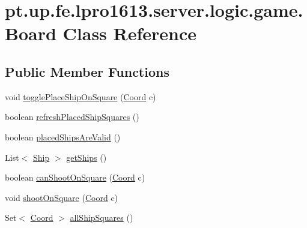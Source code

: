 \hypertarget{classpt_1_1up_1_1fe_1_1lpro1613_1_1server_1_1logic_1_1game_1_1_board}{}\section{pt.\+up.\+fe.\+lpro1613.\+server.\+logic.\+game.\+Board Class Reference}
\label{classpt_1_1up_1_1fe_1_1lpro1613_1_1server_1_1logic_1_1game_1_1_board}
\subsection*{Public Member Functions}
\begin{DoxyCompactItemize}
\item 
void \hyperlink{classpt_1_1up_1_1fe_1_1lpro1613_1_1server_1_1logic_1_1game_1_1_board_a494fc0dd022bb909054efeb930add9ee}{toggle\+Place\+Ship\+On\+Square} (\hyperlink{classpt_1_1up_1_1fe_1_1lpro1613_1_1sharedlib_1_1utils_1_1_coord}{Coord} c)
\item 
boolean \hyperlink{classpt_1_1up_1_1fe_1_1lpro1613_1_1server_1_1logic_1_1game_1_1_board_a1360050b45e38cf819885dc19e564a09}{refresh\+Placed\+Ship\+Squares} ()
\item 
boolean \hyperlink{classpt_1_1up_1_1fe_1_1lpro1613_1_1server_1_1logic_1_1game_1_1_board_a8da7e24b29b48930983ad769b447ff65}{placed\+Ships\+Are\+Valid} ()
\item 
List$<$ \hyperlink{classpt_1_1up_1_1fe_1_1lpro1613_1_1server_1_1logic_1_1game_1_1_ship}{Ship} $>$ \hyperlink{classpt_1_1up_1_1fe_1_1lpro1613_1_1server_1_1logic_1_1game_1_1_board_aaf2e7b01d28bbf83f6878de30f5300fc}{get\+Ships} ()
\item 
boolean \hyperlink{classpt_1_1up_1_1fe_1_1lpro1613_1_1server_1_1logic_1_1game_1_1_board_aa790ab38adc17bb119335c5f8fa05d2f}{can\+Shoot\+On\+Square} (\hyperlink{classpt_1_1up_1_1fe_1_1lpro1613_1_1sharedlib_1_1utils_1_1_coord}{Coord} c)
\item 
void \hyperlink{classpt_1_1up_1_1fe_1_1lpro1613_1_1server_1_1logic_1_1game_1_1_board_afb97d92e700f1eda19c74c609b2f8bf9}{shoot\+On\+Square} (\hyperlink{classpt_1_1up_1_1fe_1_1lpro1613_1_1sharedlib_1_1utils_1_1_coord}{Coord} c)
\item 
Set$<$ \hyperlink{classpt_1_1up_1_1fe_1_1lpro1613_1_1sharedlib_1_1utils_1_1_coord}{Coord} $>$ \hyperlink{classpt_1_1up_1_1fe_1_1lpro1613_1_1server_1_1logic_1_1game_1_1_board_ab60a6234f1c71f63d6f7fcb69d2186d8}{all\+Ship\+Squares} ()
\item 

\end{DoxyCompactItemize}

